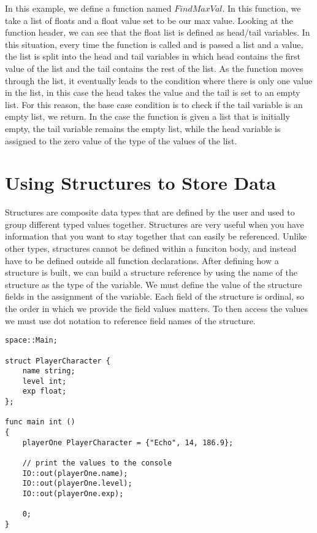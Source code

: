 \documentclass{article}
\begin{document}
In this example, we define a function named $FindMaxVal$. In this function, we take a list of floats and a float value set to be our max value. Looking at the function
header, we can see that the float list is defined as head/tail variables. In this situation, every time the function is called and is passed a list and a value, the list
is split into the head and tail variables in which head contains the first value of the list and the tail contains the rest of the list. As the function moves through the
list, it eventually leads to the condition where there is only one value in the list, in this case the head takes the value and the tail is set to an empty list. For this
reason, the base case condition is to check if the tail variable is an empty list, we return. In the case the function is given a list that is initially empty, the tail
variable remains the empty list, while the head variable is assigned to the zero value of the type of the values of the list.


\section{Using Structures to Store Data}

Structures are composite data types that are defined by the user and used to group different typed values together. Structures are very useful when you have information
that you want to stay together that can easily be referenced. Unlike other types, structures cannot be defined within a funciton body, and instead have to be defined outside all
function declarations. After defining how a structure is built, we can build a structure reference by using the name of the structure as the type of the variable. We must
define the value of the structure fields in the assignment of the variable. Each field of the structure is ordinal, so the order in which we provide
the field values matters. To then access the values we must use dot notation to reference field names of the structure.

\begin{lstlisting}
space::Main;

struct PlayerCharacter {
	name string;
	level int;
	exp float;
};

func main int ()
{
	playerOne PlayerCharacter = {"Echo", 14, 186.9};

	// print the values to the console
	IO::out(playerOne.name);
	IO::out(playerOne.level);
	IO::out(playerOne.exp);

	0;
}
\end{lstlisting}
\end{document}
